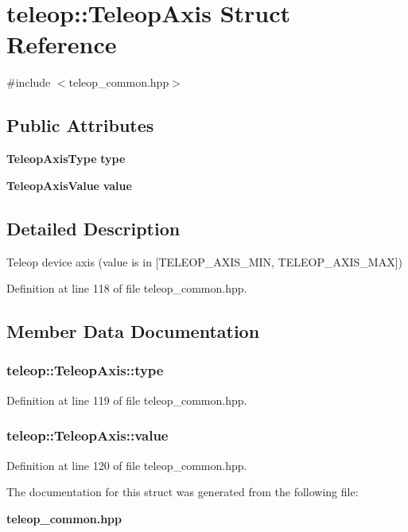\section{teleop::TeleopAxis Struct Reference}
\label{structteleop_1_1TeleopAxis}


{\ttfamily \#include $<$teleop\_\-common.hpp$>$}

\subsection*{Public Attributes}
\begin{DoxyCompactItemize}
\item 
{\bf TeleopAxisType} {\bf type}
\item 
{\bf TeleopAxisValue} {\bf value}
\end{DoxyCompactItemize}


\subsection{Detailed Description}
Teleop device axis (value is in [TELEOP\_\-AXIS\_\-MIN, TELEOP\_\-AXIS\_\-MAX]) 

Definition at line 118 of file teleop\_\-common.hpp.



\subsection{Member Data Documentation}
\subsubsection[{type}]{ {\bf teleop::TeleopAxis::type}}\label{structteleop_1_1TeleopAxis_a58fbf33e3c6d2adad996c1241f501d62}


Definition at line 119 of file teleop\_\-common.hpp.

\subsubsection[{value}]{ {\bf teleop::TeleopAxis::value}}\label{structteleop_1_1TeleopAxis_a91054bd85c1385032673ab0c235a4c59}


Definition at line 120 of file teleop\_\-common.hpp.



The documentation for this struct was generated from the following file:\begin{DoxyCompactItemize}
\item 
{\bf teleop\_\-common.hpp}\end{DoxyCompactItemize}
